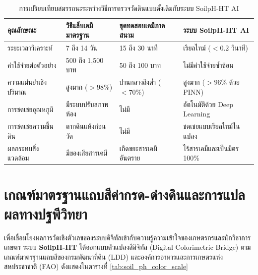 \begin{table}[H]
\centering
\caption{การเปรียบเทียบสมรรถนะระหว่างวิธีการตรวจวัดดินแบบดั้งเดิมกับระบบ SoilpH-HT AI}
\label{tab:comparison_methods}
\begin{tabularx}{\textwidth}{p{3.0cm}p{3.2cm}p{3.5cm}Y}
    \toprule
    \textbf{คุณลักษณะ} & \textbf{วิธีแล็บเคมีมาตรฐาน} & \textbf{ชุดทดสอบเคมีภาคสนาม} & \textbf{ระบบ SoilpH-HT AI} \\
    \midrule
    ระยะเวลาวิเคราะห์ & 7 ถึง 14 วัน & 15 ถึง 30 นาที & เรียลไทม์ ($< 0.2$ วินาที) \\
    ค่าใช้จ่ายต่อตัวอย่าง & 500 ถึง 1,500 บาท & 50 ถึง 100 บาท & ไม่มีค่าใช้จ่ายซ้ำซ้อน \\
    ความแม่นยำเชิงปริมาณ & สูงมาก ($> 98\%$) & ปานกลางถึงต่ำ ($< 70\%$) & สูงมาก ($> 96\%$ ด้วย PINN) \\
    การชดเชยอุณหภูมิ & มีระบบปรับสภาพห้อง & ไม่มี & อัตโนมัติด้วย Deep Learning \\
    การชดเชยความชื้นดิน & ตากดินแห้งก่อนวัด & ไม่มี & ชดเชยแบบเรียลไทม์ในแปลง \\
    ผลกระทบสิ่งแวดล้อม & มีของเสียสารเคมี & เกิดขยะสารเคมีอันตราย & ไร้สารเคมีและเป็นมิตร 100\% \\
    \bottomrule
\end{tabularx}
\end{table}

\section{เกณฑ์มาตรฐานแถบสีค่ากรด-ด่างดินและการแปลผลทางปฐพีวิทยา}

เพื่อเชื่อมโยงผลการวัดเชิงตัวเลขของระบบดิจิทัลเข้ากับความรู้ความเข้าใจของเกษตรกรและนักวิชาการเกษตร ระบบ \textbf{SoilpH-HT} ได้ออกแบบตัวแปลงสีดิจิทัล (Digital Colorimetric Bridge) ตามเกณฑ์มาตรฐานแถบสีของกรมพัฒนาที่ดิน (LDD) และองค์การอาหารและการเกษตรแห่งสหประชาชาติ (FAO) ดังแสดงในตารางที่ \ref{tab:soil_ph_color_scale}

